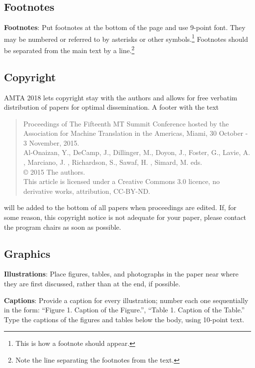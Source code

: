 \documentclass[]{article}
\newcommand{\confname}{AMTA 2018}
\begin{document}
\subsection{Footnotes}

{\bf Footnotes}: Put footnotes at the bottom of the page and use
9-point font. They may be numbered or referred to by asterisks or
other symbols.\footnote{This is how a footnote should appear.}
Footnotes should be separated from the main text by a
line.\footnote{Note the line separating the footnotes from the text.}

\subsection{Copyright}


\confname{} lets copyright stay with the authors and allows for free verbatim distribution of papers for optimal dissemination. A footer with the text
\begin{quote}
\begin{small}
\begin{it}
  Proceedings of The Fifteenth MT Summit Conference hosted by the Association for Machine Translation in the Americas, Miami, 30 October - 3 November, 2015.\\
  Al-Onaizan, Y., DeCamp, J., Dillinger, M., Doyon, J., Foster, G., Lavie, A. , Marciano, J. , Richardson, S., Sawaf, H. , Simard,
  M. eds.\\
  \copyright{} 2015 The authors.\\
  This article is licensed under a Creative Commons 3.0 licence, no
  derivative works, attribution, CC-BY-ND.
\end{it}
\end{small}
\end{quote}
will be added to the bottom of all papers when proceedings are
edited. If, for some reason, this copyright notice is not adequate for
your paper, please contact the program chairs as soon as possible. 

\subsection{Graphics}

{\bf Illustrations}: Place figures, tables, and photo\-graphs in the
paper near where they are first discussed, rather than at the end, if
possible.

{\bf Captions}: Provide a caption for every illustration; number
each one sequentially in the form:  ``Figure 1. Caption of the
Figure.'', ``Table 1. Caption of the Table.''  Type the captions of
the figures and tables below the body, using 10-point text.

\small



\end{document}
